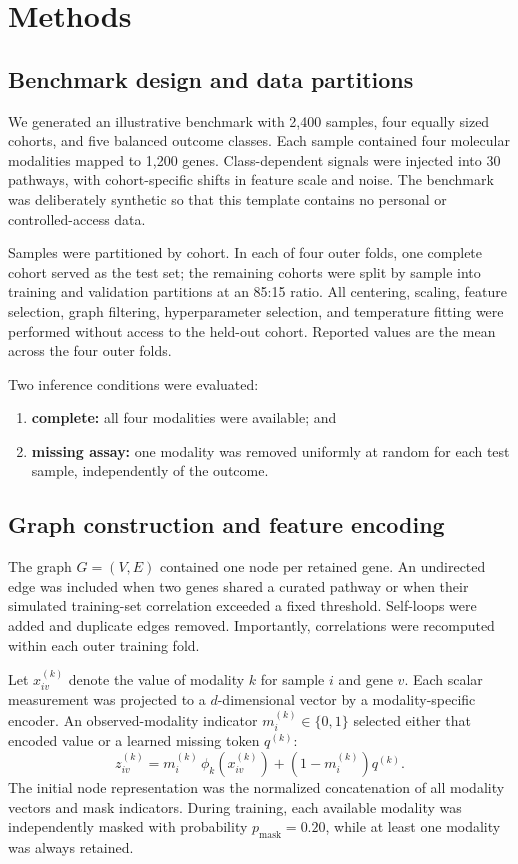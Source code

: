 \section{Methods}

\subsection{Benchmark design and data partitions}

We generated an illustrative benchmark with 2,400 samples, four equally sized
cohorts, and five balanced outcome classes. Each sample contained four molecular
modalities mapped to 1,200 genes. Class-dependent signals were injected into 30
pathways, with cohort-specific shifts in feature scale and noise. The benchmark
was deliberately synthetic so that this template contains no personal or
controlled-access data.

Samples were partitioned by cohort. In each of four outer folds, one complete
cohort served as the test set; the remaining cohorts were split by sample into
training and validation partitions at an 85:15 ratio. All centering, scaling,
feature selection, graph filtering, hyperparameter selection, and temperature
fitting were performed without access to the held-out cohort. Reported values
are the mean across the four outer folds.

Two inference conditions were evaluated:
\begin{enumerate}
  \item \textbf{complete:} all four modalities were available; and
  \item \textbf{missing assay:} one modality was removed uniformly at random for
  each test sample, independently of the outcome.
\end{enumerate}

\subsection{Graph construction and feature encoding}

The graph $G=(V,E)$ contained one node per retained gene. An undirected edge was
included when two genes shared a curated pathway or when their simulated
training-set correlation exceeded a fixed threshold. Self-loops were added and
duplicate edges removed. Importantly, correlations were recomputed within each
outer training fold.

Let $x_{iv}^{(k)}$ denote the value of modality $k$ for sample $i$ and gene $v$.
Each scalar measurement was projected to a $d$-dimensional vector by a
modality-specific encoder. An observed-modality indicator $m_i^{(k)}\in\{0,1\}$
selected either that encoded value or a learned missing token $q^{(k)}$:
\begin{equation}
z_{iv}^{(k)} = m_i^{(k)}\,\phi_k\!\left(x_{iv}^{(k)}\right)
 + \left(1-m_i^{(k)}\right)q^{(k)}.
\label{eq:mask}
\end{equation}
The initial node representation was the normalized concatenation of all modality
vectors and mask indicators. During training, each available modality was
independently masked with probability $p_{\mathrm{mask}}=0.20$, while at least one
modality was always retained.

